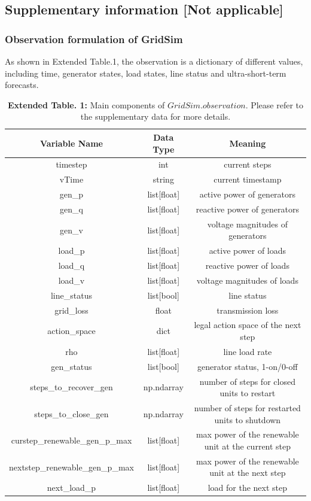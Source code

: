 \subsection*{Supplementary information [Not applicable]}

\subsubsection*{Observation formulation of GridSim}
As shown in Extended Table.1, the observation is a dictionary of different values, including time, generator states, load states, line status and ultra-short-term forecasts.
\begin{table}[h]
    \centering
    \begin{tiny}
    \begin{tabular}{ccc}
    \toprule
        Variable Name & Data Type & Meaning \\
    \midrule
        timestep & int & current steps \\
        vTime & string & current timestamp \\
        gen\_p & list[float] & active power of generators \\
        gen\_q & list[float] & reactive power of generators \\
        gen\_v & list[float] & voltage magnitudes of generators \\
        load\_p & list[float] & active power of loads \\
        load\_q & list[float] & reactive power of loads \\
        load\_v & list[float] & voltage magnitudes of loads \\
        line\_status & list[bool] & line status \\
        grid\_loss & float & transmission loss \\
        action\_space & dict & legal action space of the next step\\
        rho & list[float] & line load rate\\
        gen\_status & list[bool] & generator status, 1-on/0-off \\
        steps\_to\_recover\_gen & np.ndarray & number of steps for closed units to restart \\
        steps\_to\_close\_gen & np.ndarray & number of steps for restarted units to shutdown \\
        curstep\_renewable\_gen\_p\_max & list[float] & max power of the renewable unit at the current step \\
        nextstep\_renewable\_gen\_p\_max & list[float] & max power of the renewable unit at the next step \\
        next\_load\_p & list[float] & load for the next step \\
    \bottomrule
    \end{tabular}
    \captionsetup{labelformat=empty}
    \caption{\textbf{Extended Table. 1:} Main components of $GridSim.observation$. Please refer to the supplementary data for more details.}
    \end{tiny}
    \label{tab:observation}
\end{table}

